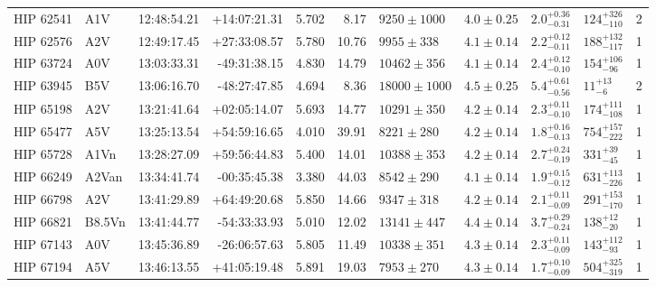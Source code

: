 \begin{landscape}
\begin{scriptsize}
\begin{longtable}{|l|lrrrrlllll|}
   HIP 62541 &      A1V &    12:48:54.21 &   +14:07:21.31 &   5.702 &      8.17 &   $9250 \pm 1000$ &  $4.0 \pm 0.25$ &  $2.0^{+0.36}_{-0.31}$ &   $124^{+326}_{-110}$ &       2 \\
   HIP 62576 &      A2V &    12:49:17.45 &   +27:33:08.57 &   5.780 &     10.76 &    $9955 \pm 338$ &  $4.1 \pm 0.14$ &  $2.2^{+0.12}_{-0.11}$ &   $188^{+132}_{-117}$ &       1 \\
   HIP 63724 &      A0V &    13:03:33.31 &   -49:31:38.15 &   4.830 &     14.79 &   $10462 \pm 356$ &  $4.1 \pm 0.14$ &  $2.4^{+0.12}_{-0.10}$ &    $154^{+106}_{-96}$ &       1 \\
   HIP 63945 &      B5V &    13:06:16.70 &   -48:27:47.85 &   4.694 &      8.36 &  $18000 \pm 1000$ &  $4.5 \pm 0.25$ &  $5.4^{+0.61}_{-0.56}$ &       $11^{+13}_{-6}$ &       2 \\
   HIP 65198 &      A2V &    13:21:41.64 &   +02:05:14.07 &   5.693 &     14.77 &   $10291 \pm 350$ &  $4.2 \pm 0.14$ &  $2.3^{+0.11}_{-0.10}$ &   $174^{+111}_{-108}$ &       1 \\
   HIP 65477 &      A5V &    13:25:13.54 &   +54:59:16.65 &   4.010 &     39.91 &    $8221 \pm 280$ &  $4.2 \pm 0.14$ &  $1.8^{+0.16}_{-0.13}$ &   $754^{+157}_{-222}$ &       1 \\
   HIP 65728 &     A1Vn &    13:28:27.09 &   +59:56:44.83 &   5.400 &     14.01 &   $10388 \pm 353$ &  $4.2 \pm 0.14$ &  $2.7^{+0.24}_{-0.19}$ &     $331^{+39}_{-45}$ &       1 \\
   HIP 66249 &    A2Van &    13:34:41.74 &   -00:35:45.38 &   3.380 &     44.03 &    $8542 \pm 290$ &  $4.1 \pm 0.14$ &  $1.9^{+0.15}_{-0.12}$ &   $631^{+113}_{-226}$ &       1 \\
   HIP 66798 &      A2V &    13:41:29.89 &   +64:49:20.68 &   5.850 &     14.66 &    $9347 \pm 318$ &  $4.2 \pm 0.14$ &  $2.1^{+0.11}_{-0.09}$ &   $291^{+153}_{-170}$ &       1 \\
   HIP 66821 &   B8.5Vn &    13:41:44.77 &   -54:33:33.93 &   5.010 &     12.02 &   $13141 \pm 447$ &  $4.4 \pm 0.14$ &  $3.7^{+0.29}_{-0.24}$ &     $138^{+12}_{-20}$ &       1 \\
   HIP 67143 &      A0V &    13:45:36.89 &   -26:06:57.63 &   5.805 &     11.49 &   $10338 \pm 351$ &  $4.3 \pm 0.14$ &  $2.3^{+0.11}_{-0.09}$ &    $143^{+112}_{-93}$ &       1 \\
   HIP 67194 &      A5V &    13:46:13.55 &   +41:05:19.48 &   5.891 &     19.03 &    $7953 \pm 270$ &  $4.3 \pm 0.14$ &  $1.7^{+0.10}_{-0.09}$ &   $504^{+325}_{-319}$ &       1 \\

\end{longtable}
\end{scriptsize}
\end{landscape}
